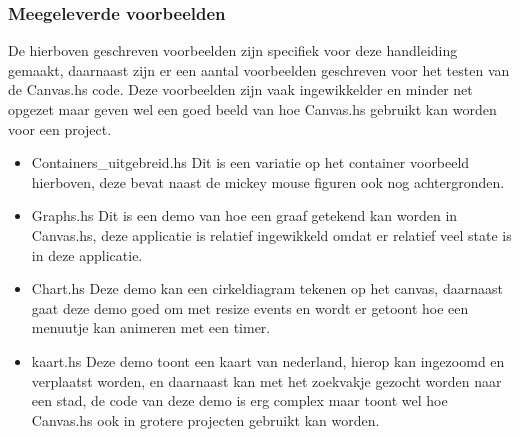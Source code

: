 

\subsubsection{Meegeleverde voorbeelden}
De hierboven geschreven voorbeelden zijn specifiek voor deze handleiding gemaakt, daarnaast zijn er een aantal voorbeelden geschreven voor het testen van de Canvas.hs code. Deze voorbeelden zijn vaak ingewikkelder en minder net opgezet maar geven wel een goed beeld van hoe Canvas.hs gebruikt kan worden voor een project.

\begin{itemize}
    \item Containers\_uitgebreid.hs
Dit is een variatie op het container voorbeeld hierboven, deze bevat naast de mickey mouse figuren ook nog achtergronden.
    \item Graphs.hs
Dit is een demo van hoe een graaf getekend kan worden in Canvas.hs, deze applicatie is relatief ingewikkeld omdat er relatief veel state is in deze applicatie.
    \item Chart.hs
Deze demo kan een cirkeldiagram tekenen op het canvas, daarnaast gaat deze demo goed om met resize events en wordt er getoont hoe een menuutje kan animeren met een timer.
    \item kaart.hs
Deze demo toont een kaart van nederland, hierop kan ingezoomd en verplaatst worden, en daarnaast kan met het zoekvakje gezocht worden naar een stad, de code van deze demo is erg complex maar toont wel hoe Canvas.hs ook in grotere projecten gebruikt kan worden.
\end{itemize}

